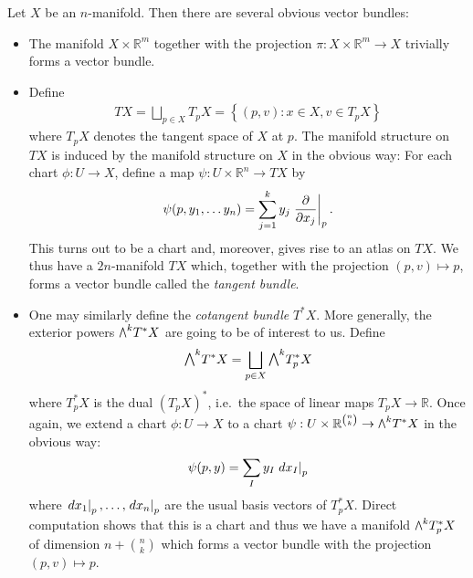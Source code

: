 \documentclass{article}
\begin{document}
\begin{example}\label{ex:bundles}
  Let $X$ be an $n$-manifold. Then there are several obvious vector bundles:
  \begin{itemize}
    \item The manifold $X\times\mathbb{R}^m$ together with the projection $\pi : X\times\mathbb{R}^m\to X$ trivially forms a vector bundle.
    \item Define
      \begin{align*}
        TX = \bigsqcup_{p\in X} T_p X = \left\lbrace{(p, v) : x \in X, v \in T_p X}\right\rbrace
      \end{align*}
      where $T_p X$ denotes the tangent space of $X$ at $p$. The manifold
      structure on $TX$ is induced by the manifold structure on $X$ in the
      obvious way: For each chart $\phi:U\to X$, define a map
      $\psi:U\times\mathbb{R}^n\to TX$ by
      \begin{align*}
        \psi(p,y_1,\ldots y_n)
        = \sum_{j=1}^k y_j \left.{\frac{\partial}{\partial x_j}}\right\vert_{p}.
      \end{align*}
      This turns out to be a chart  and, moreover, gives rise
      to an atlas on $TX$. We thus have a $2n$-manifold $TX$ which, together with the projection $(p,v)\mapsto p$, forms a vector bundle called the \emph{tangent bundle}.
    \item One may similarly define the \emph{cotangent bundle} $T^*X$.
      More generally, the exterior powers $\exterior{k}{T^* X}$ are going
      to be of interest to us. Define
      \begin{align*}
        \exterior{k}{T^*X} = \bigsqcup_{p\in X} \exterior{k}{T^*_p X}
      \end{align*}
      where $T^*_p X$ is the dual $(T_pX)^*$, i.e.~the space of linear
      maps $T_p X\to\mathbb{R}$. Once again, we extend a chart
      $\phi:U\to X$ to a chart $\psi : U\times\mathbb{R}^{\binom{n}{k}}\to \exterior{k}{T^*X}$ in the obvious way:
      \begin{align*}
        \psi(p,y) = \sum_I y_I \left.{dx_I}\right\vert_{p}
      \end{align*}
      where $\left.{dx_1}\right\vert_{p},\ldots,\left.{dx_n}\right\vert_{p}$ are the usual basis vectors of
      $T^*_p X$. Direct computation shows that this is a chart and
      thus we have a manifold $\exterior{k}{T^*_p X}$ of dimension
      $n+\binom{n}{k}$ which forms a vector bundle with the
      projection $(p,v)\mapsto p$.
  \end{itemize}
\end{example}
\end{document}
